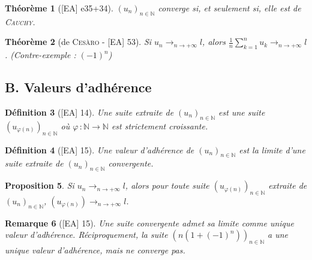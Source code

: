 \documentclass[10pt, a4paper, parskip=full, twoside, twocolumn]{report}
\newtheorem{definition}{Définition}
\newtheorem{theorem}[definition]{Théorème}
\newtheorem{proposition}[definition]{Proposition}
\newtheorem{remark}[definition]{Remarque}
\newcommand{\IN}{\mathbb{N}}
\begin{document}
\begin{theorem}[\textnormal{[EA] e35+34}]
	$\left(u_n\right)_{n\in\IN}$ converge si, et seulement si, elle est de \textsc{Cauchy}.
\end{theorem}

\begin{theorem}[de \textsc{Cesàro} - \textnormal{[EA] 53}]
	Si $u_n\longrightarrow_{n\to +\infty} l$, alors $\frac{1}{n}\sum_{k=1}^{n} u_k \longrightarrow_{n\to +\infty} l$. (Contre-exemple :  $(-1)^n$)
\end{theorem}

\subsection*{B. Valeurs d'adhérence}
\begin{definition}[\textnormal{[EA] 14}]
	Une \emph{suite extraite de $\left(u_n\right)_{n\in\IN}$} est une suite $\left(u_{\varphi(n)}\right)_{n\in\IN}$ où $\varphi\,\colon\IN\to\IN$ est strictement croissante.
\end{definition}

\begin{definition}[\textnormal{[EA] 15}]
	Une \emph{valeur d'adhérence} de $\left(u_n\right)_{n\in\IN}$ est la limite d'une suite extraite de $\left(u_n\right)_{n\in\IN}$ convergente.
\end{definition}

\begin{proposition}
	Si $u_n\longrightarrow_{n\to +\infty} l$, alors pour toute suite $\left(u_{\varphi(n)}\right)_{n\in\IN}$ extraite de $\left(u_n\right)_{n\in\IN}$, $\left(u_{\varphi(n)}\right)\longrightarrow_{n\to +\infty} l$.
\end{proposition}

\begin{remark}[\textnormal{[EA] 15}]
	Une suite convergente admet sa limite comme unique valeur d'adhérence. Réciproquement,
	la suite $\left(n(1+(-1)^n)\right)_{n\in\IN}$ a une unique valeur d'adhérence, mais ne converge pas.
\end{remark}



\end{document}
